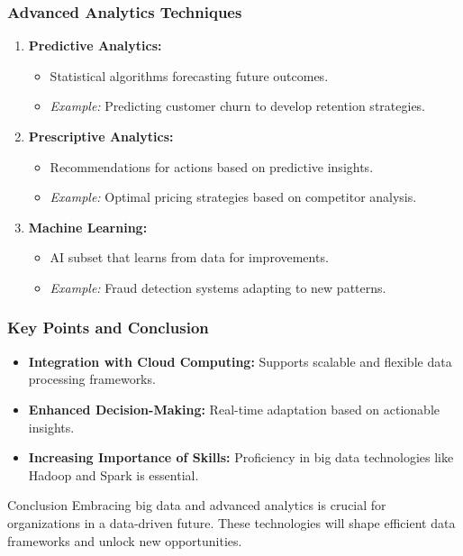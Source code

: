 \documentclass{beamer}
\begin{document}
\begin{frame}[fragile]
    \frametitle{Advanced Analytics Techniques}
    \begin{enumerate}
        \item \textbf{Predictive Analytics:}
            \begin{itemize}
                \item Statistical algorithms forecasting future outcomes.
                \item \textit{Example:} Predicting customer churn to develop retention strategies.
            \end{itemize}
        \item \textbf{Prescriptive Analytics:}
            \begin{itemize}
                \item Recommendations for actions based on predictive insights.
                \item \textit{Example:} Optimal pricing strategies based on competitor analysis.
            \end{itemize}
        \item \textbf{Machine Learning:}
            \begin{itemize}
                \item AI subset that learns from data for improvements.
                \item \textit{Example:} Fraud detection systems adapting to new patterns.
            \end{itemize}
    \end{enumerate}
\end{frame}

\begin{frame}[fragile]
    \frametitle{Key Points and Conclusion}
    \begin{itemize}
        \item \textbf{Integration with Cloud Computing:} 
            Supports scalable and flexible data processing frameworks.
        \item \textbf{Enhanced Decision-Making:} 
            Real-time adaptation based on actionable insights.
        \item \textbf{Increasing Importance of Skills:} 
            Proficiency in big data technologies like Hadoop and Spark is essential.
    \end{itemize}
    \begin{block}{Conclusion}
        Embracing big data and advanced analytics is crucial for organizations in a data-driven future. These technologies will shape efficient data frameworks and unlock new opportunities.
    \end{block}
\end{frame}
\end{document}
